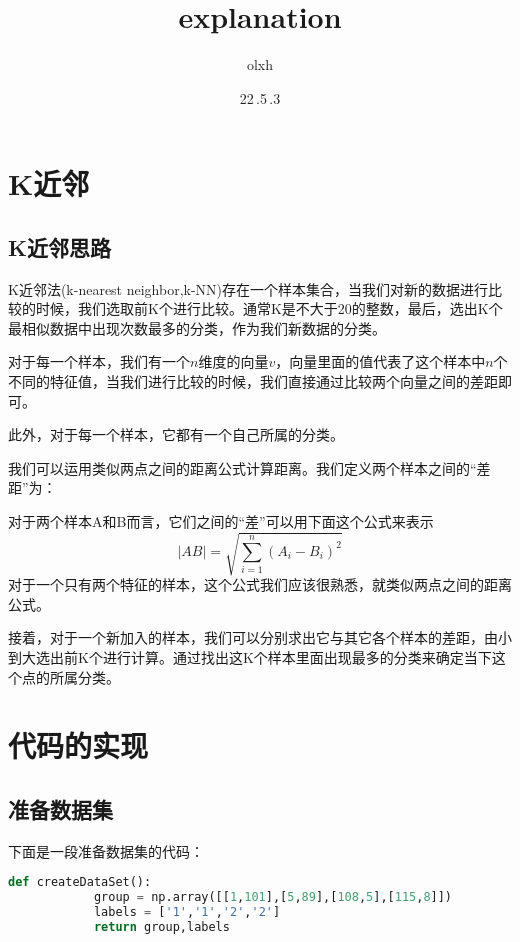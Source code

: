 \documentclass[11pt,twoside,a4paper]{article}
\begin{document}
    \title{explanation}
    \author{olxh}
    \date{22\,.5\,.3}

    \maketitle
    \section{K近邻}
    \subsection{K近邻思路}
        K近邻法(k-nearest neighbor,k-NN)存在一个样本集合，当我们对新的数据进行比较的时候，我们选取前K个进行比较。通常K是不大于20的整数，最后，选出K个最相似数据中出现次数最多的分类，作为我们新数据的分类。
    
        对于每一个样本，我们有一个$n$维度的向量$v$，向量里面的值代表了这个样本中$n$个不同的特征值，当我们进行比较的时候，我们直接通过比较两个向量之间的差距即可。
        
        此外，对于每一个样本，它都有一个自己所属的分类。

        我们可以运用类似两点之间的距离公式计算距离。我们定义两个样本之间的“差距”为：

        对于两个样本A和B而言，它们之间的“差”可以用下面这个公式来表示
        \begin{displaymath}
            |AB| = \sqrt{ \sum_{i=1}^{n} (A_i-B_i)^2 }
        \end{displaymath}
        对于一个只有两个特征的样本，这个公式我们应该很熟悉，就类似两点之间的距离公式。

        接着，对于一个新加入的样本，我们可以分别求出它与其它各个样本的差距，由小到大选出前K个进行计算。通过找出这K个样本里面出现最多的分类来确定当下这个点的所属分类。


    \section{代码的实现}
    \subsection{准备数据集}
        下面是一段准备数据集的代码：
        \begin{lstlisting}[language={Python}]
            def createDataSet():
            group = np.array([[1,101],[5,89],[108,5],[115,8]])
            labels = ['1','1','2','2']
            return group,labels
        \end{lstlisting}
\end{document}
